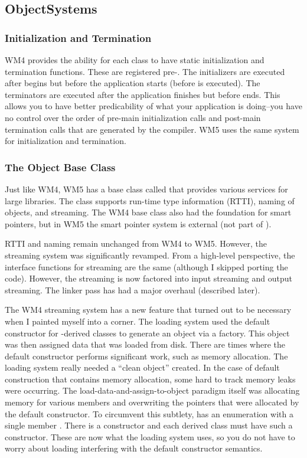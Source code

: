 \documentclass{article}
\begin{document}
\subsection{ObjectSystems}

\subsubsection{Initialization and Termination}

WM4 provides the ability for each class to have static initialization and termination
functions.  These are registered pre-.  The initializers are executed after
 begins but before the application starts (before  is
executed).  The terminators are executed after the application finishes but before
 ends.  This allows you to have better predicability of what your application
is doing--you have no control over the order of pre-main initialization calls and
post-main termination calls that are generated by the compiler.  WM5 uses the same
system for initialization and termination.

\subsubsection{The Object Base Class}

Just like WM4, WM5 has a base class called  that provides various
services for large libraries.  The class supports run-time type information (RTTI),
naming of objects, and streaming.  The WM4 base class also had the foundation for
smart pointers, but in WM5 the smart pointer system is external (not part of
).

RTTI and naming remain unchanged from WM4 to WM5.  However, the streaming system
was significantly revamped.  From a high-level perspective, the interface functions
for streaming are the same (although I skipped porting the  code).
However, the streaming is now factored into input streaming and output streaming.
The linker pass has had a major overhaul (described later).

The WM4 streaming system has a new feature that turned out to be necessary
when I painted myself into a corner.  The loading system used the default
constructor for -derived classes to generate an object via a
factory.  This object was then assigned data that was loaded from disk.  There
are times where the default constructor performs significant work, such as
memory allocation.  The loading system really needed a ``clean object'' created.
In the case of default construction that contains memory allocation, some
hard to track memory leaks were occurring.  The load-data-and-assign-to-object
paradigm itself was allocating memory for various members and overwriting the
pointers that were allocated by the default constructor.  To circumvent this
subtlety,  has an enumeration  with a single
member .  There is a constructor 
and each derived class must have such a constructor.  These are now what the
loading system uses, so you do not have to worry about loading interfering
with the default constructor semantics.
\end{document}
